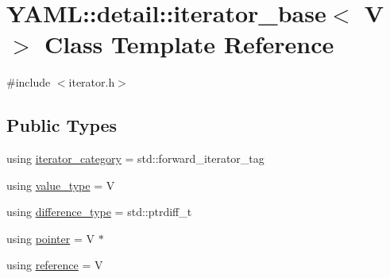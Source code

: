 \hypertarget{class_y_a_m_l_1_1detail_1_1iterator__base}{}\section{Y\+A\+ML\+::detail\+::iterator\+\_\+base$<$ V $>$ Class Template Reference}
\label{class_y_a_m_l_1_1detail_1_1iterator__base}


{\ttfamily \#include $<$iterator.\+h$>$}

\subsection*{Public Types}
\begin{DoxyCompactItemize}
\item 
using \mbox{\hyperlink{class_y_a_m_l_1_1detail_1_1iterator__base_ac98b382d4a92feab7cbcc3bb0bbef9a3}{iterator\+\_\+category}} = std\+::forward\+\_\+iterator\+\_\+tag
\item 
using \mbox{\hyperlink{class_y_a_m_l_1_1detail_1_1iterator__base_a21987ede08ffbfacc0e3caa39e66cb00}{value\+\_\+type}} = V
\item 
using \mbox{\hyperlink{class_y_a_m_l_1_1detail_1_1iterator__base_a54a83cdcf34a0ca929bf41be84da866e}{difference\+\_\+type}} = std\+::ptrdiff\+\_\+t
\item 
using \mbox{\hyperlink{class_y_a_m_l_1_1detail_1_1iterator__base_a1d2a6d42b258a593e8ae888de6c63435}{pointer}} = V $\ast$
\item 
using \mbox{\hyperlink{class_y_a_m_l_1_1detail_1_1iterator__base_aed8b6adc6449894e1e66bb81a75a4ca0}{reference}} = V
\end{DoxyCompactItemize}
